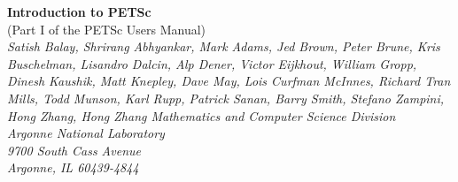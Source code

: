 %
%
%
%


\def\design{\medskip \noindent Design Issue:\begin{em}}
\def\enddesign{\end{em} \medskip}


\def\shortintro{*}
\renewcommand{\cite}[1]{}
\def\thesection {$\!\!\!\!$}

\usepackage{fancyhdr,lastpage}
\pagestyle{fancy}



\begin{center}
$\!$
\vspace{1.0cm}
\thispagestyle{empty}

{\huge \bf Introduction to PETSc}\\
\vspace{0.5cm}
{\LARGE (Part I of the PETSc Users Manual)} \\
\vspace{1.5cm}
{\large \em Satish Balay, Shrirang Abhyankar, Mark Adams, Jed Brown, Peter Brune, Kris Buschelman, Lisandro Dalcin, Alp Dener, Victor Eijkhout, William Gropp, Dinesh Kaushik, Matt Knepley, Dave May, Lois Curfman McInnes, Richard Tran Mills, Todd Munson, Karl Rupp, Patrick Sanan, Barry Smith, Stefano Zampini, Hong Zhang, Hong Zhang
\medskip \medskip
Mathematics and Computer Science Division\\
Argonne National Laboratory\\
9700 South Cass Avenue\\
Argonne, IL 60439-4844\\
}
\end{center}

\vspace{1.0cm}

\newpage


